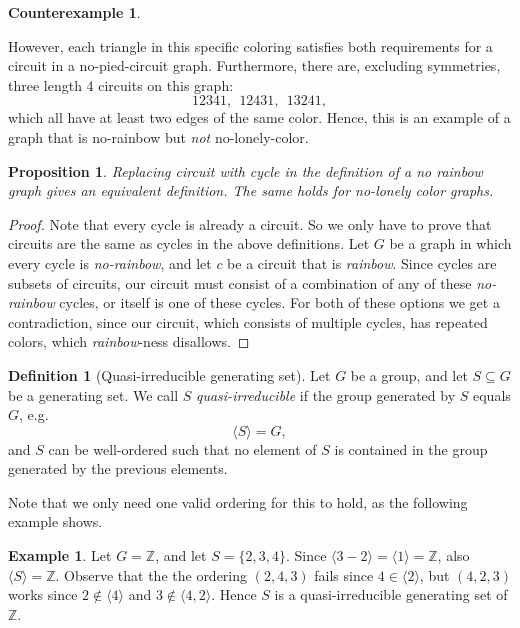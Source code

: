 \documentclass[a4paper,10pt]{article}
\numberwithin{equation}{section}
\newtheorem{proposition}[theorem]{Proposition}
\theoremstyle{definition}
\newtheorem{definition}[theorem]{Definition}
\newtheorem*{example}{Example}
\newtheorem*{counterexample}{Counterexample}
\begin{document}
\begin{counterexample}
\begin{center}
        \end{center}
        However, each triangle in this specific coloring satisfies both requirements for a circuit in a no-pied-circuit graph. Furthermore, there are, excluding symmetries, three length 4 circuits on this graph:
        \[12341,\ \ 12431,\ \ 13241,\]
        which all have at least two edges of the same color. Hence, this is an example of a graph that is no-rainbow but \emph{not} no-lonely-color.
    \end{counterexample}
    \begin{proposition}
        Replacing circuit with cycle in the definition of a no rainbow graph gives an equivalent definition. The same holds for no-lonely color graphs.
    \end{proposition}
    \begin{proof}
        Note that every cycle is already a circuit. So we only have to prove that circuits are the same as cycles in the above definitions.
        Let \(G\) be a graph in which every cycle is \emph{no-rainbow}, and let \(c\) be a circuit that is \emph{rainbow}. Since cycles are subsets of circuits, our circuit must consist of a combination of any of these \emph{no-rainbow} cycles, or itself is one of these cycles. For both of these options we get a contradiction, since our circuit, which consists of multiple cycles, has repeated colors, which \emph{rainbow}-ness disallows.
    \end{proof}
    \begin{definition}[Quasi-irreducible generating set]\label{quasi}
        Let \(G\) be a group, and let \(S\subseteq G\) be a generating set. We call \(S\) \emph{quasi-irreducible} if the group generated by \(S\) equals \(G\), e.g.
        \[\langle S\rangle = G,\]
        and \(S\) can be well-ordered such that no element of \(S\) is contained in the group generated by the previous elements.
    \end{definition}
    Note that we only need one valid ordering for this to hold, as the following example shows.
    \begin{example}
        Let \(G = \mathbb{Z}\), and let \(S = \{2,3,4\}\). Since \(\langle 3-2\rangle = \langle 1\rangle = \mathbb{Z}\), also \(\langle S\rangle = \mathbb{Z}\).
        Observe that the the ordering \((2,4,3)\) fails since \(4\in \langle 2\rangle\), but \((4, 2, 3)\) works since \(2\notin\langle 4\rangle\) and \(3\notin\langle 4,2\rangle\). 
        Hence \(S\) is a quasi-irreducible generating set of \(\mathbb{Z}\).
    \end{example}
\end{document}
